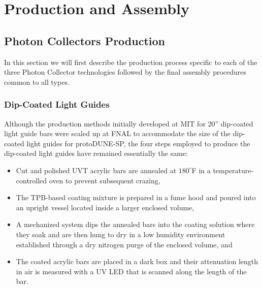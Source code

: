 \section{Production and Assembly}
\label{sec:fdsp-pd-prod-assy}

\subsection{Photon Collectors Production}
\label{sec:fdsp-pd-prod-pc}

In this section we will first describe the production process specific to each of the three Photon Collector technologies followed by the final assembly procedures common to all types. 

\subsubsection{Dip-Coated Light Guides}
\label{ssec:fdsp-pd-pc-prod-bar1}

Although the production methods initially developed at MIT for 20'' dip-coated light guide bars were scaled up at FNAL to accommodate the size of the dip-coated light guides for protoDUNE-SP, the four steps employed to produce the dip-coated light guides have remained essentially the same:

\begin{itemize}
\item Cut and polished UVT acrylic bars are annealed at $180^{\circ}$F in a temperature-controlled oven to prevent subsequent crazing,
\item The TPB-based coating mixture is prepared in a fume hood and poured into an upright vessel located inside a larger enclosed volume,
\item A mechanized system dips the annealed bars into the coating solution where they soak and are then hung to dry in a low humidity environment established through a dry nitrogen purge of the enclosed volume, and
\item The coated acrylic bars are placed in a dark box and their attenuation length in air is measured with a UV LED that is scanned along the length of the bar.
\end{itemize}

